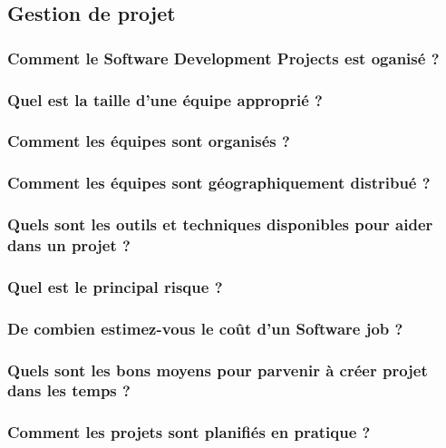 \subsection{Gestion de projet}

\subsubsection{Comment le Software Development Projects est oganisé ?}
\subsubsection{Quel est la taille d'une équipe approprié ?}
\subsubsection{Comment les équipes sont organisés ?}
\subsubsection{Comment les équipes sont géographiquement distribué ?}
\subsubsection{Quels sont les outils et techniques disponibles pour aider dans un projet ?}
\subsubsection{Quel est le principal risque ?}
\subsubsection{De combien estimez-vous le coût d'un Software job ?}
\subsubsection{Quels sont les bons moyens pour parvenir à créer projet dans les temps ?}
\subsubsection{Comment les projets sont planifiés en pratique ?}